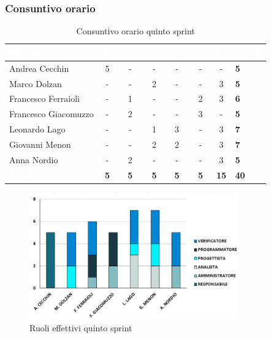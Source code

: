 \subsubsection{Consuntivo orario}
{
\setlength{\tabcolsep}{10pt}
\renewcommand{\arraystretch}{1.5}
\begin{table}[h!]
    \centering
    \begin{tabularx}{\textwidth}{| l | c | c | c | c | c | c | X |}
        \hline
        \rowcolor{headerrow} \textbf{\textcolor{white}{Membro}} & \textbf{\textcolor{white}{R.}} & \textbf{\textcolor{white}{Am.}} & \textbf{\textcolor{white}{Pj.}} & \textbf{\textcolor{white}{An.}} & \textbf{\textcolor{white}{Pg.}} & \textbf{\textcolor{white}{V.}} & \textbf{\textcolor{white}{Totale}} \\
        \hline
        Andrea Cecchin & 5 & -  & - & - & - & - & \textbf{5} \\
        \hline
        Marco Dolzan & - & - & 2 & - & - & 3 & \textbf{5} \\
        \hline
        Francesco Ferraioli & - & 1 & - & - & 2 & 3 & \textbf{6} \\
        \hline  
        Francesco Giacomuzzo & - & 2 & - & - & 3 & - & \textbf{5} \\
        \hline
        Leonardo Lago & - & - & 1 & 3 & - & 3 & \textbf{7} \\
        \hline
        Giovanni Menon & - & - & 2 & 2 & - & 3 & \textbf{7} \\
        \hline
        Anna Nordio & - & 2 & - & - & - & 3 & \textbf{5} \\
        \hline
    \cellcolor{headerrow} \textbf{\textcolor{white}{Totale}} & \textbf{5} & \textbf{5} & \textbf{5} & \textbf{5} & \textbf{5} & \textbf{15} & \textbf{40} \\
        \hline
    \end{tabularx} 
    \caption{Consuntivo orario quinto sprint}
    \label{tab:consuntivoorarioquintosprint}
\end{table}
}

\begin{figure}[h!]
    \centering
    \includegraphics[width=0.8\textwidth]{cons5ruoli.png}
    \caption{Ruoli effettivi quinto sprint}
    \label{fig:consuntivoorarioquintosprint}
\end{figure}

